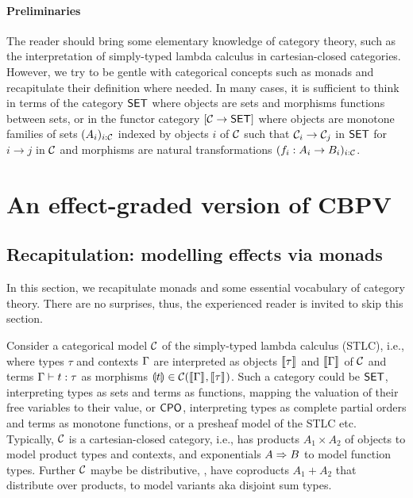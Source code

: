 \documentclass[acmsmall,review,anonymous]{acmart}\settopmatter{printfolios=true,printccs=false,printacmref=false}
\theoremstyle{remark}
\begin{document}
\paragraph*{Preliminaries}  The reader should bring some elementary
knowledge of category theory, such as the interpretation of
simply-typed lambda calculus in cartesian-closed categories.  However,
we try to be gentle with categorical concepts such as monads and
recapitulate their definition where needed.  In many cases, it is
sufficient to think in terms of the category $\mathsf{SET}$ where objects are
sets and morphisms functions between sets, or in the functor category
$[\mathcal{C} \to \mathsf{SET}]$ where objects are monotone families of sets
$(A_i)_{i:\mathcal{C}}$ indexed by objects $i$ of $\mathcal{C}$ such that
$\mathcal{C}_i \to \mathcal{C}_j$ in $\mathsf{SET}$ for $i \to j$ in $\mathcal{C}$ and morphisms are
natural transformations $(f_i : A_i \to B_i)_{i:\mathcal{C}}$.

\section{An effect-graded version of CBPV}
\label{sec:effect}


\subsection{Recapitulation: modelling effects via monads}
\label{sec:ccc}

In this section, we recapitulate monads and some essential vocabulary
of category theory.  There are no surprises, thus, the experienced
reader is invited to skip this section.

Consider a categorical model $\mathcal{C}$ of the simply-typed lambda calculus
(STLC), i.e., where types $\tau$ and contexts $\Gamma$ are interpreted as
objects $\llbracket\tau\rrbracket^{}$ and $\llbracket\Gamma\rrbracket^{}$ of $\mathcal{C}$ and terms
$\Gamma \vdash t : \tau$ as morphisms $\llparenthesis t\rrparenthesis \in \mathcal{C}(\llbracket\Gamma\rrbracket^{},\llbracket\tau\rrbracket^{})$.
Such a category could be $\mathsf{SET}$, interpreting types as sets and terms
as functions, mapping the valuation of their free variables to their
value, or $\mathsf{CPO}$, interpreting types as complete partial orders and
terms as monotone functions, or a presheaf model of the STLC etc.
Typically, $\mathcal{C}$ is a cartesian-closed category, i.e., has products
$A_1 \times A_2$ of objects to model product types and contexts,
and exponentials $A \Rightarrow B$ to model function types.
Further $\mathcal{C}$ maybe be distributive,
\ie, have coproducts $A_1 + A_2$ that distribute over products, to
model variants aka disjoint sum types.
\end{document}
